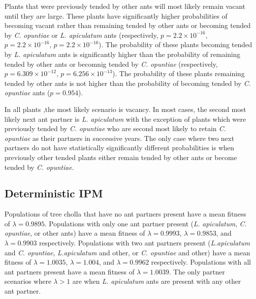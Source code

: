 \documentclass[11pt]{article}
\begin{document}
{{%
Plants that were previously tended by other ants will most likely remain vacant until they are large. 
These plants have significantly higher probabilities of becoming vacant rather than remaining tended by other ants or becoming tended by \textit{C. opuntiae} or \textit{L. apiculatum} ants (respectively, $p = 2.2 \times 10^{-16}$, $p = 2.2 \times 10^{-16}$, $p = 2.2 \times 10^{-16}$).
The probability of these plants becoming tended by \textit{L. apiculatum} ants is significantly higher than the probability of remaining tended by other ants or becomnig tended by \textit{C. opuntiae} (respectively, $p = 6.309 \times 10^{-12}$, $p = 6.256 \times 10^{-13}$).
The probability of these plants remaining tended by other ants is not higher than the probability of becoming tended by \textit{C. opuntiae} ants ($p = 0.954$). 

In all plants ,the most likely scenario is vacancy.
In most cases, the second most likely next ant partner is \textit{L. apiculatum} with the exception of plants which were previously tended by \textit{C. opuntiae} who are second most likely to retain \textit{C. opuntiae} as their partners in successive years.
The only case where two next partners do not have statistically significantly different probabilities is when previously other tended plants either remain tended by other ants or become tended by \textit{C. opuntiae}. 

\subsection*{Deterministic IPM}
Populations of tree cholla that have no ant partners present have a mean fitness of $\lambda = 0.9895$.
Populations with only one ant partner present (\textit{L. apiculatum}, \textit{C. opuntiae}, or other ants) have a mean fitness of $\lambda = 0.9993$, $\lambda = 0.9853$, and $\lambda = 0.9903$ respectively.
Populations with two ant partners present (\textit{L.apiculatum} and \textit{C. opuntiae}, \textit{L.apiculatum} and other, or \textit{C. opuntiae} and other) have a mean fitness of $\lambda = 1.0035$, $\lambda = 1.004$, and $\lambda = 0.9962$ respectively. 
Populations with all ant partners present have a mean fitness of $\lambda = 1.0039$.
The only partner scenarios where $\lambda > 1$ are when \textit{L. apiculatum} ants are present with any other ant partner. 

}}
\end{document}
